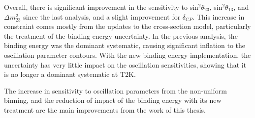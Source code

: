 Overall, there is significant improvement in the sensitivity to sin$^2\theta_{23}$, sin$^2\theta_{13}$, and $\Delta m^{2}_{23}$ since the last analysis, and a slight improvement for $\delta_{CP}$. This increase in constraint comes mostly from the updates to the cross-section model, particularly the treatment of the binding energy uncertainty. In the previous analysis, the binding energy was the dominant systematic, causing significant inflation to the oscillation parameter contours. With the new binding energy implementation, the uncertainty has very little impact on the oscillation sensitivities, showing that it is no longer a dominant systematic at T2K. 

The increase in sensitivity to oscillation parameters from the non-uniform binning, and the reduction of impact of the binding energy with its new treatment are the main improvements from the work of this thesis.

\newpage
